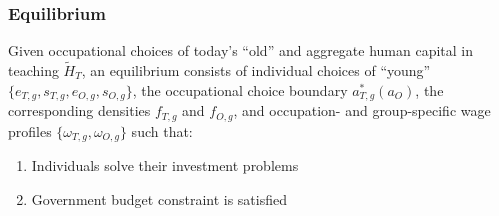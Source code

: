 \documentclass[11pt,hyperref={bookmarks=false},table,aspectratio=169]{beamer}
\begin{document}
%

\begin{frame}
\frametitle{Equilibrium}
\label{eqm}
Given occupational choices of today's ``old'' and aggregate human capital in teaching $\widetilde{H}_{T}$, an equilibrium consists of individual choices of ``young'' $\{e_{T,g}, s_{T,g}, e_{O,g}, s_{O,g}\}$, the occupational choice boundary $a^*_{T,g}(a_O)$, the corresponding densities $f_{T,g}$ and $f_{O,g}$, and occupation- and group-specific wage profiles $\{\omega_{T,g}, \omega_{O,g}\}$ such that:
\begin{enumerate}
	\item Individuals solve their investment problems \\
	\hyperlink{time_inv}{} \hyperlink{good_inv}{}
	\item Government budget constraint is satisfied
\end{enumerate}

\hfill \hyperlink{laws}{} \\
\hfill \hyperlink{td}{}
\end{frame}
\end{document}
